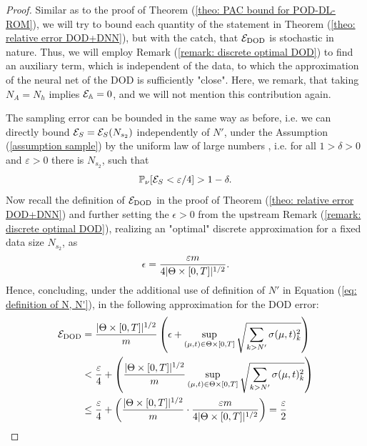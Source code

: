 \begin{proof}
    Similar as to the proof of Theorem (\ref{theo: PAC bound for POD-DL-ROM}), we will try to bound each quantity
    of the statement in Theorem (\ref{theo: relative error DOD+DNN}), but with the catch, that $\mathcal{E}_{\text{DOD}}$ is
    stochastic in nature. Thus, we will employ Remark (\ref{remark: discrete optimal DOD}) to find an auxiliary term,
    which is independent of the data, to which the approximation of the neural net of the DOD is sufficiently "close". 
    Here, we remark, that taking $N_A = N_h$ implies $\mathcal{E}_{\mathbb{A}} = 0$, and we will not mention
    this contribution again.
    
    The sampling error can be bounded in the same way as before, i.e. we can directly bound 
    $\mathcal{E}_S = \mathcal{E}_S(N_{s_2})$ independently of $N'$, under the Assumption (\ref{assumption sample})
    by the uniform law of large numbers \cite{newey1994}, i.e. for all $1 > \delta > 0$ and $\varepsilon > 0$ there is $N_{s_2}$, such that
    \begin{equation} \label{eq: S error dod-dl-rom}
        \mathbb{P}_\nu[\mathcal{E}_S < \varepsilon / 4] > 1 - \delta.
    \end{equation}
    Now recall the definition of $\mathcal{E}_{\text{DOD}}$ in the proof of Theorem (\ref{theo: relative error DOD+DNN}) and 
    further setting the $\epsilon > 0$ from the upstream Remark (\ref{remark: discrete optimal DOD}), realizing
    an "optimal" discrete approximation for a fixed data size $N_{s_2}$, as
    \begin{equation*}
        \epsilon = \frac{\varepsilon m}{4 \lvert \Theta \times [0, T] \rvert^{1/2}}.
    \end{equation*}
    Hence, concluding, under the additional use of definition of $N'$ in Equation
    (\ref{eq: definition of N, N'}), in the following approximation for the DOD error:
    \begin{equation} \label{eq: dod error dod-dl-rom}
        \begin{aligned}
            \mathcal{E}_{\text{DOD}} &= \frac{\lvert \Theta \times [0, T] \rvert^{1/2}}{m} \left( \epsilon + 
            \sup\limits_{(\mu, t) \in \Theta \times [0, T]} \sqrt{\sum_{k > N'} \sigma(\mu, t)_k^2} \right) \\
            &< \frac{\varepsilon}{4} + \left( \frac{\lvert \Theta \times [0, T] \rvert^{1/2}}{m}
            \sup\limits_{(\mu, t) \in \Theta \times [0, T]} \sqrt{\sum_{k > N'} \sigma(\mu, t)_k^2}
            \right) \\
            &\leq \frac{\varepsilon}{4} + \left( \frac{\lvert \Theta \times [0, T] \rvert^{1/2}}{m} \cdot 
            \frac{\varepsilon m}{4 \lvert \Theta \times [0, T] \rvert^{1/2}} \right)
            = \frac{\varepsilon}{2}
        \end{aligned}
    \end{equation}


\end{proof}
